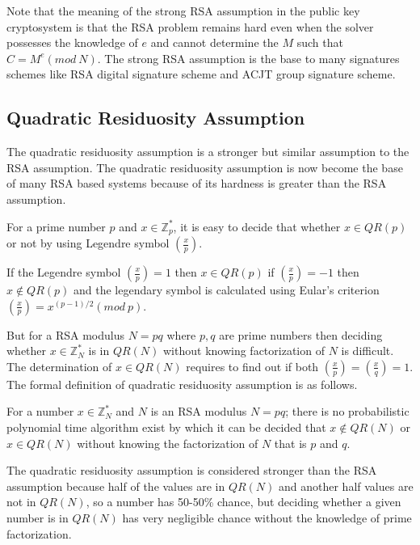 Note that the meaning of the strong RSA assumption in the public key cryptosystem is that the RSA problem remains hard even when the solver possesses the knowledge of $e$ and cannot determine the $M$ such that $C = M^e (mod~N)$. The strong RSA assumption is the base to many signatures schemes like RSA digital signature scheme and ACJT group signature scheme.

\subsection{Quadratic Residuosity Assumption}
The quadratic residuosity assumption is a stronger but similar assumption to the RSA assumption. The quadratic residuosity assumption is now become the base of many RSA based systems because of its hardness is greater than the RSA assumption.

For a prime number $p$ and $x \in \mathbb{Z}^*_p$, it is easy to decide that whether $x \in QR(p)$ or not by using Legendre symbol $(\frac{x}{p})$. 

If the Legendre symbol $(\frac{x}{p}) = 1$ then $x \in QR(p)$ if $(\frac{x}{p}) = -1$ then $x \notin QR(p)$ and the legendary symbol is calculated using Eular's criterion $(\frac{x}{p}) = x^{(p-1)/2}(mod~p)$.

But for a RSA modulus $N = pq$ where $p, q$ are prime numbers then deciding whether $x \in  \mathbb{Z}^*_N$ is in $QR(N)$ without knowing factorization of $N$ is difficult. The determination of $x \in QR(N)$ requires to find out if both $(\frac{x}{p}) = (\frac{x}{q}) = 1$. The formal definition of quadratic residuosity assumption is as follows.

\begin{definition} For a number $x \in  \mathbb{Z}^*_N$ and $N$ is an RSA modulus $N = pq$; there is no probabilistic polynomial time algorithm exist by which it can be decided that $x \notin QR(N)$ or $x \in QR(N)$ without knowing the factorization of $N$ that is $p$ and $q$.
\end{definition}
The quadratic residuosity assumption is considered stronger than the RSA assumption because half of the values are in $QR(N)$ and another half values are not in $QR(N)$, so a number has 50-50\% chance, but deciding whether a given number is in $QR(N)$ has very negligible chance without the knowledge of prime factorization.

